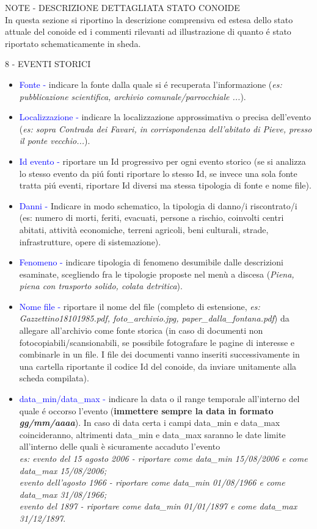 \documentclass[12pt,a4paper]{article}
\begin{document}
\begin{flushleft}
\vskip 5mm
NOTE - DESCRIZIONE DETTAGLIATA STATO CONOIDE\\
In questa sezione si riportino la descrizione comprensiva ed estesa dello stato attuale del conoide ed i commenti rilevanti ad illustrazione di quanto \'e stato riportato schematicamente in sheda.

\vskip 5mm
8 - EVENTI STORICI\\
\begin{itemize}
\item{\textcolor{blue}{Fonte - }} indicare la fonte dalla quale si \'e recuperata l'informazione (\textit{es: pubblicazione scientifica, archivio comunale/parrocchiale ...}).
\item{\textcolor{blue}{Localizzazione - }} indicare la localizzazione approssimativa o precisa dell'evento (\textit{es: sopra Contrada dei Favari, in corrispondenza dell'abitato di Pieve, presso il ponte vecchio...}).
\item{\textcolor{blue}{Id evento - }} riportare un Id progressivo per ogni evento storico (se si analizza lo stesso evento da pi\'u fonti riportare lo stesso Id, se invece una sola fonte tratta pi\'u eventi, riportare Id diversi ma stessa tipologia di fonte e nome file).
\item{\textcolor{blue}{Danni - }} Indicare in modo schematico, la tipologia di danno/i riscontrato/i (es: numero di morti, feriti, evacuati, persone a rischio, coinvolti centri abitati, attività economiche, terreni agricoli, beni culturali, strade, infrastrutture, opere di sistemazione).
\item{\textcolor{blue}{Fenomeno - }} indicare tipologia di fenomeno desumibile dalle descrizioni esaminate, scegliendo fra le tipologie proposte nel menù a discesa (\textit{Piena, piena con trasporto solido, colata detritica}).
\item{\textcolor{blue}{Nome file - }} riportare il nome del file (completo di estensione, \textit{es: Gazzettino18101985.pdf, foto\_archivio.jpg, paper\_dalla\_fontana.pdf}) da allegare all'archivio come fonte storica (in caso di documenti non fotocopiabili/scansionabili, se possibile fotografare le pagine di interesse e combinarle in un file. I file dei documenti vanno inseriti successivamente in una cartella riportante il codice Id del conoide, da inviare unitamente alla scheda compilata).
\item{\textcolor{blue}{data\_min/data\_max - }} indicare la data o il range temporale all'interno del quale \'e occorso l'evento (\textbf{immettere sempre la data in formato \textit{gg/mm/aaaa}}). In caso di data certa i campi data\_min e data\_max coincideranno, altrimenti data\_min e data\_max saranno le date limite all'interno delle quali è sicuramente accaduto l'evento\\ \textit{es: evento del 15 agosto 2006 - riportare come data\_min 15/08/2006 e come data\_max 15/08/2006;\\ evento dell'agosto 1966 - riportare come data\_min 01/08/1966 e come data\_max 31/08/1966;\\ evento del 1897 - riportare come data\_min 01/01/1897 e come data\_max 31/12/1897}.

\end{itemize}
\end{flushleft}
\end{document}
